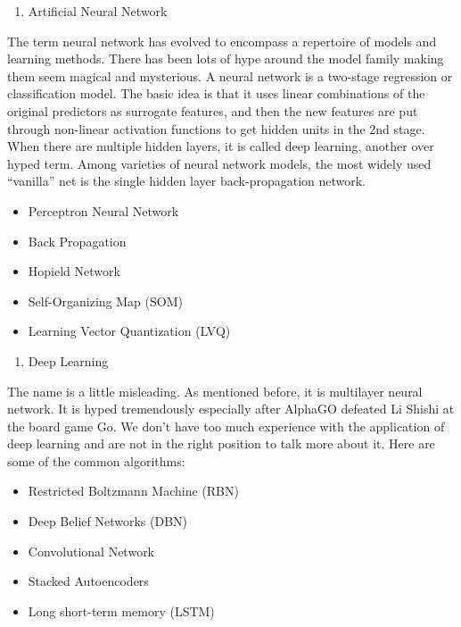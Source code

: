 \documentclass[12pt,]{krantz}
\providecommand{\tightlist}{%
  \setlength{\itemsep}{0pt}\setlength{\parskip}{0pt}}
\theoremstyle{definition}
\theoremstyle{definition}
\theoremstyle{remark}
\begin{document}
\begin{enumerate}
\def\labelenumi{\arabic{enumi}.}
\setcounter{enumi}{9}
\tightlist
\item
  Artificial Neural Network
\end{enumerate}

The term neural network has evolved to encompass a repertoire of models
and learning methods. There has been lots of hype around the model
family making them seem magical and mysterious. A neural network is a
two-stage regression or classification model. The basic idea is that it
uses linear combinations of the original predictors as surrogate
features, and then the new features are put through non-linear
activation functions to get hidden units in the 2nd stage. When there
are multiple hidden layers, it is called deep learning, another over
hyped term. Among varieties of neural network models, the most widely
used ``vanilla'' net is the single hidden layer back-propagation
network.

\begin{itemize}
\tightlist
\item
  Perceptron Neural Network
\item
  Back Propagation
\item
  Hopield Network
\item
  Self-Organizing Map (SOM)
\item
  Learning Vector Quantization (LVQ)
\end{itemize}

\begin{enumerate}
\def\labelenumi{\arabic{enumi}.}
\setcounter{enumi}{10}
\tightlist
\item
  Deep Learning
\end{enumerate}

The name is a little misleading. As mentioned before, it is multilayer
neural network. It is hyped tremendously especially after AlphaGO
defeated Li Shishi at the board game Go. We don't have too much
experience with the application of deep learning and are not in the
right position to talk more about it. Here are some of the common
algorithms:

\begin{itemize}
\tightlist
\item
  Restricted Boltzmann Machine (RBN)
\item
  Deep Belief Networks (DBN)
\item
  Convolutional Network
\item
  Stacked Autoencoders
\item
  Long short-term memory (LSTM)
\end{itemize}
\end{document}

